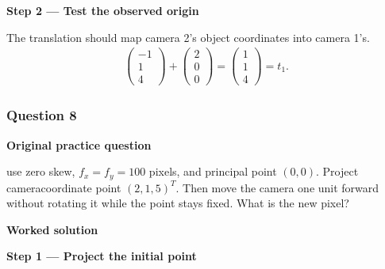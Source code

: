 \documentclass[letterpaper,11pt,english,openany,oneside]{jupyterBook}
\begin{document}
\par\medskip{}
{\color{QuizStepRed}\bfseries Step 2 — Test the observed origin}\par\smallskip

\sphinxAtStartPar
{} The translation should map camera 2’s object coordinates into camera 1’s.
{\color{QuizMathBlue} \begin{equation*}
\begin{split}
\begin{pmatrix}-1\\1\\4\end{pmatrix}+\begin{pmatrix}2\\0\\0\end{pmatrix}=\begin{pmatrix}1\\1\\4\end{pmatrix}=t_1.
\end{split}
\end{equation*}}
\par

\par\medskip


\subsubsection{Question 8}
\label{\detokenize{lectures/lecture01/tldr:question-8}}\label{\detokenize{lectures/lecture01/tldr:lec01-tldr-q8}}
\par\medskip\textbf{Original practice question}\par\smallskip

\sphinxAtStartPar
{} use zero skew, \(f_x=f_y=100\) pixels, and principal point \((0,0)\). Project camera\sphinxhyphen{}coordinate point \((2,1,5)^T\). Then move the camera one unit forward without rotating it while the point stays fixed. What is the new pixel?

\par\medskip

\par\medskip
\textbf{Worked solution}\par\smallskip

\par\medskip{}
{\color{QuizStepRed}\bfseries Step 1 — Project the initial point}\par\smallskip
\end{document}
